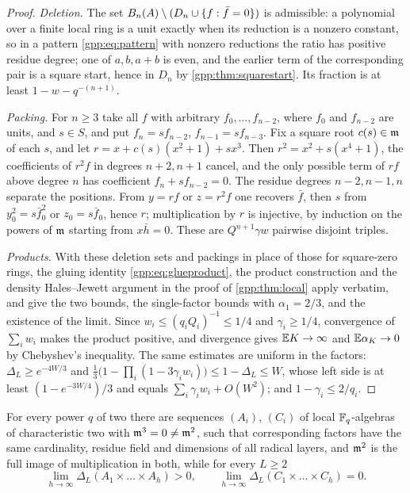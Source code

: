 \begin{proof}
\emph{Deletion.} The set $B_n(A)\setminus(D_n\cup\{f:\bar f=0\})$ is admissible: a
polynomial over a finite local ring is a unit exactly when its reduction is a nonzero
constant, so in a pattern \eqref{gpp:eq:pattern} with nonzero reductions the ratio has
positive residue degree; one of $a,b,a+b$ is even, and the earlier term of the
corresponding pair is a square start, hence in $D_n$ by \cref{gpp:thm:squarestart}. Its
fraction is at least $1-w-q^{-(n+1)}$.

\emph{Packing.} For $n\ge3$ take all $f$ with arbitrary $f_0,\dots,f_{n-2}$, where $f_0$
and $f_{n-2}$ are units, and $s\in S$, and put $f_n=sf_{n-2}$, $f_{n-1}=sf_{n-3}$. Fix a
square root $c(s)\in\mathfrak{m}$ of each $s$, and let $r=x+c(s)(x^2+1)+sx^3$. Then
$r^2=x^2+s(x^4+1)$, the coefficients of $r^2f$ in degrees $n+2,n+1$ cancel, and the only
possible term of $rf$ above degree $n$ has coefficient $f_n+sf_{n-2}=0$. The residue
degrees $n-2,n-1,n$ separate the positions. From $y=rf$ or $z=r^2f$ one recovers $\bar f$,
then $s$ from $y_0^2=s\bar f_0^2$ or $z_0=s\bar f_0$, hence $r$; multiplication by $r$ is
injective, by induction on the powers of $\mathfrak{m}$ starting from $x\bar h=0$. These are
$Q^{n+1}\gamma w$ pairwise disjoint triples.

\emph{Products.} With these deletion sets and packings in place of those for square-zero
rings, the gluing identity \eqref{gpp:eq:glueproduct}, the product construction and the
density Hales--Jewett argument in the proof of \cref{gpp:thm:local} apply verbatim, and
give the two bounds, the single-factor bounds with $\alpha_1=2/3$, and the existence of
the limit. Since $w_i\le(q_iQ_i)^{-1}\le1/4$ and $\gamma_i\ge1/4$, convergence of
$\sum_iw_i$ makes the product positive, and divergence gives $\mathbb{E} K\to\infty$ and
$\mathbb{E}\alpha_K\to0$ by Chebyshev's inequality. The same estimates are uniform in the
factors: $\Delta_L\ge e^{-4W/3}$ and
$\frac13\bigl(1-\prod_i(1-3\gamma_iw_i)\bigr)\le1-\Delta_L\le W$, whose left side is at least
$(1-e^{-3W/4})/3$ and equals $\sum_i\gamma_iw_i+O(W^2)$; and $1-\gamma_i\le2/q_i$.
\end{proof}

\begin{theorem}\label{gpp:thm:opposite}
For every power $q$ of two there are sequences $(A_i)$, $(C_i)$ of local $\mathbb{F}_q$-algebras of
characteristic two with $\mathfrak{m}^3=0\ne\mathfrak{m}^2$, such that corresponding factors have the same
cardinality, residue field and dimensions of all radical layers, and $\mathfrak{m}^2$ is the full
image of multiplication in both, while for every $L\ge2$
\[
 \lim_{h\to\infty}\Delta_L(A_1\times\dots\times A_h)>0,\qquad
 \lim_{h\to\infty}\Delta_L(C_1\times\dots\times C_h)=0 .
\]
\end{theorem}

